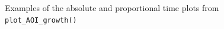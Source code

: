 \documentclass[
  man,
  floatsintext,
  longtable,
  nolmodern,
  notxfonts,
  notimes,
  colorlinks=true,linkcolor=blue,citecolor=blue,urlcolor=blue]{apa7}
\begin{document}
\begin{figure}[H]

\caption{\label{fig-growth}Examples of the absolute and proportional
time plots from \texttt{plot\_AOI\_growth()}}

\begin{minipage}{0.50\linewidth}

\subcaption{\label{fig-abs}}


\end{minipage}%
%
\begin{minipage}{0.50\linewidth}

\subcaption{\label{fig-prop}}

\centering{

}
\end{minipage}
\end{figure}
\end{document}
